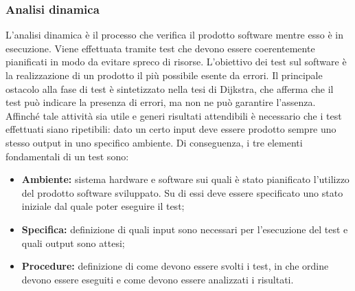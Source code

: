 \subsubsection{Analisi dinamica}
    L'analisi dinamica è il processo che verifica il prodotto software mentre esso è in esecuzione. Viene effettuata tramite test che devono essere coerentemente pianificati in modo da evitare spreco di risorse.
    L'obiettivo dei test sul software è la realizzazione di un prodotto il più possibile esente da errori. Il principale ostacolo alla fase di test è sintetizzato nella tesi di Dijkstra, che afferma che il test può indicare la presenza di errori, ma non ne può garantire l'assenza.
Affinché tale attività sia utile e generi risultati attendibili è necessario che i test effettuati
siano ripetibili: dato un certo input deve essere prodotto sempre uno stesso output in
uno specifico ambiente. Di conseguenza, i tre elementi fondamentali di un test sono:
    \begin{itemize}
    \item \textbf{Ambiente: }sistema hardware e software sui quali è stato pianificato l'utilizzo del
prodotto software sviluppato. Su di essi deve essere specificato uno stato iniziale
dal quale poter eseguire il test;
    \item \textbf{Specifica: }definizione di quali input sono necessari per l'esecuzione del test e quali output sono attesi;
    \item \textbf{Procedure: }definizione di come devono essere svolti i test, in che ordine devono
essere eseguiti e come devono essere analizzati i risultati.
    \end{itemize}


